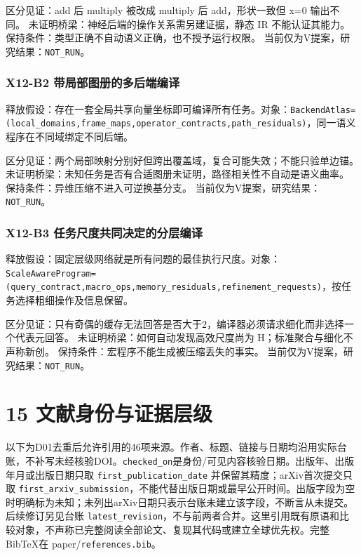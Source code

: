 \documentclass[
  10pt,
]{article}
\begin{document}
区分见证：add 后 multiply 被改成 multiply 后 add，形状一致但 x=0
输出不同。 未证明桥梁：神经后端的操作关系需另建证据，静态 IR
不能认证其能力。 保持条件：类型正确不自动语义正确，也不授予运行权限。
当前仅为V提案，研究结果：\nolinkurl{NOT_RUN}。

\subsubsection{X12-B2
带局部图册的多后端编译}\label{x12-b2-ux5e26ux5c40ux90e8ux56feux518cux7684ux591aux540eux7aefux7f16ux8bd1}

释放假设：存在一套全局共享向量坐标即可编译所有任务。对象：\nolinkurl{BackendAtlas=(local_domains,frame_maps,operator_contracts,path_residuals)}，同一语义程序在不同域绑定不同后端。

区分见证：两个局部映射分别好但跨出覆盖域，复合可能失效；不能只验单边锚。
未证明桥梁：未知任务是否有合适图册未证明，路径相关性不自动是语义曲率。
保持条件：异维压缩不进入可逆换基分支。
当前仅为V提案，研究结果：\nolinkurl{NOT_RUN}。

\subsubsection{X12-B3
任务尺度共同决定的分层编译}\label{x12-b3-ux4efbux52a1ux5c3aux5ea6ux5171ux540cux51b3ux5b9aux7684ux5206ux5c42ux7f16ux8bd1}

释放假设：固定层级网络就是所有问题的最佳执行尺度。对象：\nolinkurl{ScaleAwareProgram=(query_contract,macro_ops,memory_residuals,refinement_requests)}，按任务选择粗细操作及信息保留。

区分见证：只有奇偶的缓存无法回答是否大于2，编译器必须请求细化而非选择一个代表元回答。
未证明桥梁：如何自动发现高效尺度尚为 H；标准聚合与细化不声称新创。
保持条件：宏程序不能生成被压缩丢失的事实。
当前仅为V提案，研究结果：\nolinkurl{NOT_RUN}。

\section{15
文献身份与证据层级}\label{ux6587ux732eux8eabux4efdux4e0eux8bc1ux636eux5c42ux7ea7}

以下为D01去重后允许引用的46项来源。作者、标题、链接与日期均沿用实际台账，不补写未经核验DOI。\nolinkurl{checked_on}是身份/可见内容核验日期。出版年、出版年月或出版日期只取
\nolinkurl{first_publication_date} 并保留其精度；arXiv首次提交只取
\nolinkurl{first_arxiv_submission}，不能代替出版日期或最早公开时间。出版字段为空时明确标为未知；未列出arXiv日期只表示台账未建立该字段，不断言从未提交。后续修订另见台账
\nolinkurl{latest_revision}，不与前两者合并。这里引用既有原语和比较对象，不声称已完整阅读全部论文、复现其代码或建立全球优先权。完整BibTeX在
paper/\nolinkurl{references.bib}。
\end{document}

